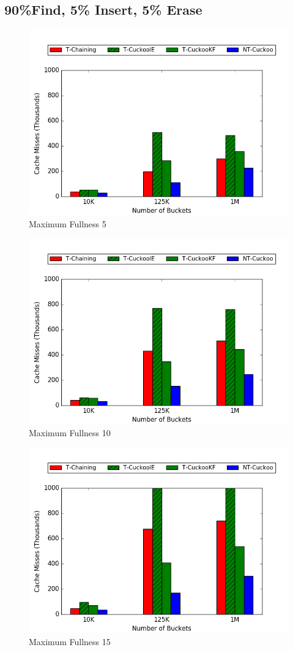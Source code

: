 \subsection{90\%Find, 5\% Insert, 5\% Erase}

\begin{figure}[H]
    \centering
        \includegraphics[width=0.75\linewidth]{maps/905cm.png}
        \caption*{Maximum Fullness 5}
\end{figure}
\begin{figure}[H]
    \centering
        \includegraphics[width=0.75\linewidth]{maps/9010cm.png}
        \caption*{Maximum Fullness 10}
\end{figure}
\begin{figure}[H]
    \centering
        \includegraphics[width=0.75\linewidth]{maps/9015cm.png}
        \caption*{Maximum Fullness 15}
\end{figure}
\fi


